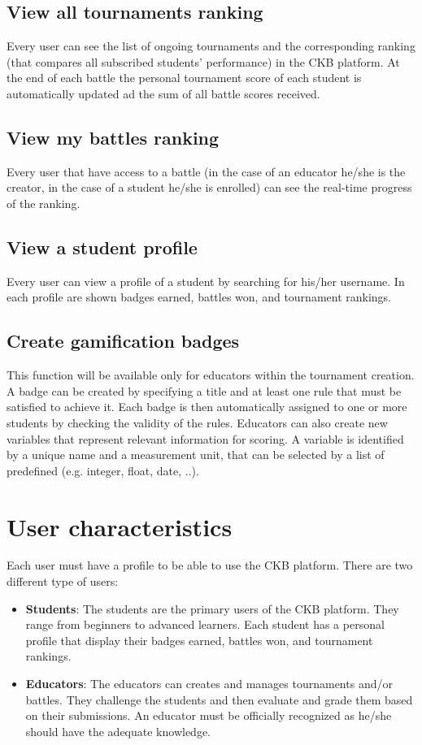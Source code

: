 \subsection{View all tournaments ranking}
Every user can see the list of ongoing tournaments and the corresponding ranking (that compares all subscribed students' performance) in the CKB platform.
At the end of each battle the personal tournament score of each student is automatically updated ad the sum of all battle scores received. 

\subsection{View my battles ranking}
Every user that have access to a battle (in the case of an educator he/she is the creator, in the case of a student he/she is enrolled) can see the real-time progress of the ranking. 

\subsection{View a student profile}
Every user can view a profile of a student by searching for his/her username. In each profile are shown badges earned, battles won, and tournament rankings. 

\subsection{Create gamification badges}
This function will be available only for educators within the tournament creation. 
\newline A badge can be created by specifying a title and at least one rule that must be satisfied to achieve it. Each badge is then automatically assigned to one or more students by checking the validity of the rules. Educators can also create new variables that represent relevant information for scoring. A variable is identified by a unique name and a measurement unit, that can be selected by a list of predefined (e.g. integer, float, date, ..).

\clearpage

\section{User characteristics}
Each user must have a profile to be able to use the CKB platform.
There are two different type of users:
\begin{itemize}
	\item \textbf{Students}:
	    The students are the primary users of the CKB platform. They range from beginners to advanced learners. Each student has a personal profile that display their badges earned, battles won, and tournament rankings. 
	\item \textbf{Educators}: 
		The educators can creates and manages tournaments and/or battles. They challenge the students and then evaluate and grade them based on their submissions. An educator must be officially recognized as he/she should have the adequate knowledge.
\end{itemize}

